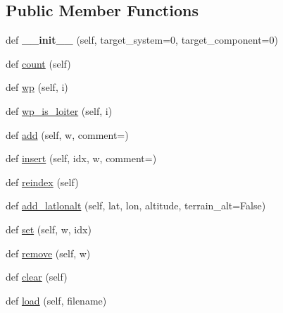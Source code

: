 \subsection*{Public Member Functions}
\begin{DoxyCompactItemize}
\item 
\mbox{\label{classpymavlink_1_1mavwp_1_1MAVWPLoader_a08660f56f7e491e1a734f8157c5246de}} 
def {\bfseries \+\_\+\+\_\+init\+\_\+\+\_\+} (self, target\+\_\+system=0, target\+\_\+component=0)
\item 
def \hyperlink{classpymavlink_1_1mavwp_1_1MAVWPLoader_ab38c2086b2274779f35762bf890f237c}{count} (self)
\item 
def \hyperlink{classpymavlink_1_1mavwp_1_1MAVWPLoader_a30cdf4df3d3797823d0137848800a204}{wp} (self, i)
\item 
def \hyperlink{classpymavlink_1_1mavwp_1_1MAVWPLoader_a286be0ad910cb10799ddb7f16a04fb10}{wp\+\_\+is\+\_\+loiter} (self, i)
\item 
def \hyperlink{classpymavlink_1_1mavwp_1_1MAVWPLoader_a32b224f0d31c036f92415dddeaa82b5d}{add} (self, w, comment=\textquotesingle{}\textquotesingle{})
\item 
def \hyperlink{classpymavlink_1_1mavwp_1_1MAVWPLoader_aa698fc16bd74560273b08b180b52c470}{insert} (self, idx, w, comment=\textquotesingle{}\textquotesingle{})
\item 
def \hyperlink{classpymavlink_1_1mavwp_1_1MAVWPLoader_aaaee4bf57d9c77b85ccc155439cacce2}{reindex} (self)
\item 
def \hyperlink{classpymavlink_1_1mavwp_1_1MAVWPLoader_a6e998a58eea829205e8c4c3cb75de107}{add\+\_\+latlonalt} (self, lat, lon, altitude, terrain\+\_\+alt=False)
\item 
def \hyperlink{classpymavlink_1_1mavwp_1_1MAVWPLoader_a7148099563199a32ccccb546115d4d24}{set} (self, w, idx)
\item 
def \hyperlink{classpymavlink_1_1mavwp_1_1MAVWPLoader_a2c039310e8284c9c86abd871be710dd1}{remove} (self, w)
\item 
def \hyperlink{classpymavlink_1_1mavwp_1_1MAVWPLoader_a292abb3c99ba217989fd7ea399d434de}{clear} (self)
\item 
def \hyperlink{classpymavlink_1_1mavwp_1_1MAVWPLoader_a8a7cd99d440f8a7ac8cb2892d07b900b}{load} (self, filename)
\item 
\mbox{\label{classpymavlink_1_1mavwp_1_1MAVWPLoader_a41cdae76bea6868abf200f8b3541fe57}} 

\end{DoxyCompactItemize}
